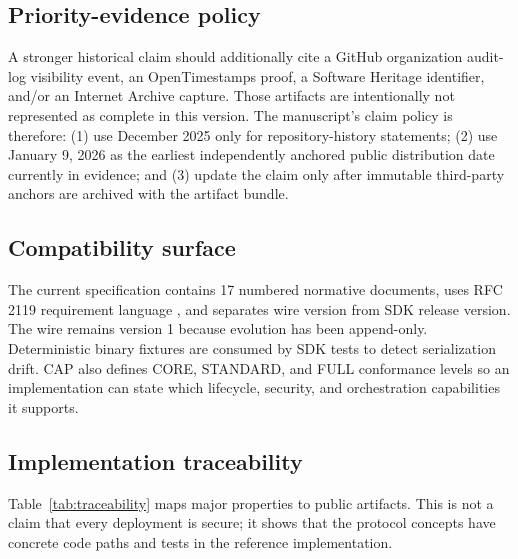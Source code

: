 \subsection{Priority-evidence policy}

A stronger historical claim should additionally cite a GitHub organization audit-log visibility event, an OpenTimestamps proof, a Software Heritage identifier, and/or an Internet Archive capture. Those artifacts are intentionally not represented as complete in this version. The manuscript's claim policy is therefore: (1) use December 2025 only for repository-history statements; (2) use January 9, 2026 as the earliest independently anchored public distribution date currently in evidence; and (3) update the claim only after immutable third-party anchors are archived with the artifact bundle.

\subsection{Compatibility surface}

The current specification contains 17 numbered normative documents, uses RFC 2119 requirement language \citep{rfc2119}, and separates wire version from SDK release version. The wire remains version 1 because evolution has been append-only. Deterministic binary fixtures are consumed by SDK tests to detect serialization drift. CAP also defines CORE, STANDARD, and FULL conformance levels so an implementation can state which lifecycle, security, and orchestration capabilities it supports.

\subsection{Implementation traceability}

Table~\ref{tab:traceability} maps major properties to public artifacts. This is not a claim that every deployment is secure; it shows that the protocol concepts have concrete code paths and tests in the reference implementation.

